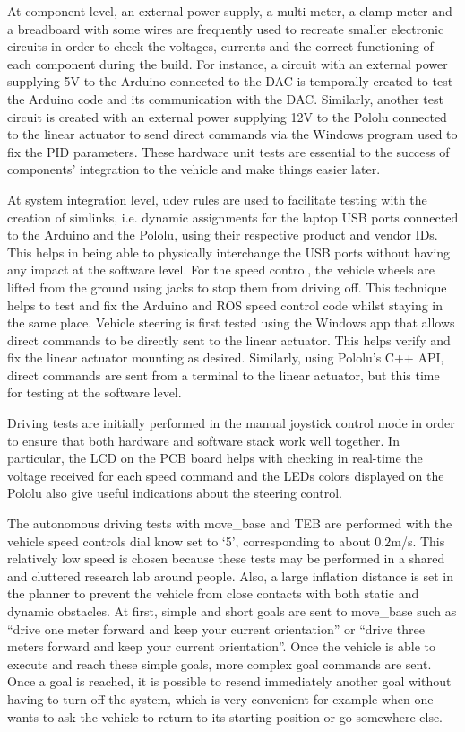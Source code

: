 \documentclass[a4paper]{article}
\begin{document}
	At component level, an external power supply, a multi-meter, a clamp meter and a breadboard with some wires are frequently used to recreate smaller electronic circuits in order to check the voltages, currents and the correct functioning of each component during the build. For instance, a circuit with an external power supplying 5V to the Arduino connected to the DAC is temporally created to test the Arduino code and its communication with the DAC.  Similarly, another test circuit is created with an external power supplying 12V to the Pololu connected to the linear actuator to send direct commands via the Windows program used to fix the PID parameters. These hardware unit tests are essential to the success of components' integration to the vehicle and make things easier later. 
	
	
	At system integration level, udev rules are used to facilitate testing with the creation of simlinks, i.e. dynamic assignments for the laptop USB ports connected to the Arduino and the Pololu, using their respective product and vendor IDs. This helps in being able to physically interchange the USB ports without having any impact at the software level. For the speed control, the vehicle wheels are lifted from the ground using jacks to stop them from driving off. This technique helps to test and fix the Arduino and ROS speed control code whilst staying in the same place. Vehicle steering is first tested using the Windows app that allows direct commands to be directly sent to the linear actuator. This helps verify and fix the linear actuator mounting as desired. Similarly, using Pololu's C++ API, direct commands are sent from a terminal to the linear actuator, but this time for testing at the software level. 
	
	Driving tests are initially performed in the manual joystick control mode in order to ensure that both hardware and software stack work well together. In particular, the LCD on the PCB board helps with checking in real-time the voltage received for each speed command and the LEDs colors displayed on the Pololu also give useful indications about the steering control. 
	
	The autonomous driving tests with move\_base and TEB are performed with the vehicle speed controls dial know set to `5', corresponding to about $0.2$m/s. This relatively low speed is chosen because these tests may be performed in a shared and cluttered research lab around people. Also, a large inflation distance is set in the planner to prevent the vehicle from close contacts with both static and dynamic obstacles. At first, simple and short goals are sent to move\_base such as ``drive one meter forward and keep your current orientation'' or ``drive three meters forward and keep your current orientation''. Once the vehicle is able to execute and reach these simple goals, more complex goal commands are sent. Once a goal is reached, it is possible to resend immediately another goal without having to turn off the system, which is very convenient for example when one wants to ask the vehicle to return to its starting position or go somewhere else. 
	
\end{document}

